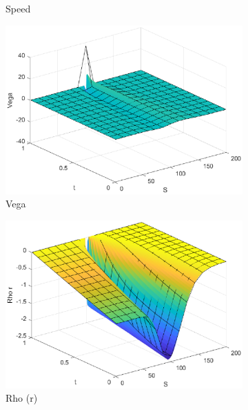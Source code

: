\begin{figure}[H]
\begin{subfigure}[b]{0.35\linewidth}
        \caption{Speed}
    \end{subfigure}
    \begin{subfigure}[b]{0.35\linewidth}
        \includegraphics[width=\linewidth]{Imagenes/6_Sols/Binary_Put/Binary_Put_Vega.eps}
        \caption{Vega}
    \end{subfigure}
    \begin{subfigure}[b]{0.35\linewidth}
        \includegraphics[width=\linewidth]{Imagenes/6_Sols/Binary_Put/Binary_Put_Rho_r.eps}
        \caption{Rho (r)}
    \end{subfigure}
    \begin{subfigure}[b]{0.35\linewidth}

\end{subfigure}
\end{figure}
